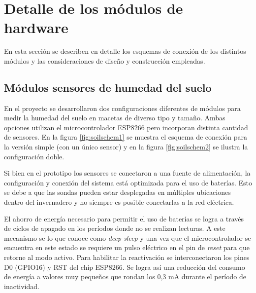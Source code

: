 \section{Detalle de los módulos de hardware}
\label{sec:Módulos de hardware}
En esta sección se describen en detalle los esquemas de conexión de los distintos módulos y las consideraciones de diseño y construcción empleadas. 

\subsection{Módulos sensores de humedad del suelo}
\label{Módulos sensores de humedad del suelo}


En el proyecto se desarrollaron dos configuraciones diferentes de módulos para medir la humedad del suelo en macetas de diverso tipo y tamaño. Ambas opciones utilizan el microcontrolador ESP8266 pero incorporan distinta cantidad de sensores. En la figura \ref{fig:soilschem1} se muestra el esquema de conexión para la versión simple (con un único sensor) y en la figura \ref{fig:soilschem2} se ilustra la configuración doble.

Si bien en el prototipo los sensores se conectaron a una fuente de alimentación, la configuración y conexión del sistema está optimizada para el uso de baterías. Esto se debe a que las sondas pueden estar desplegadas en múltiples ubicaciones dentro del invernadero y no siempre es posible conectarlas a la red eléctrica. 

El ahorro de energía necesario para permitir el uso de  baterías se logra a través de ciclos de apagado en los períodos donde no se realizan lecturas. A este mecanismo se lo que conoce como \textit{deep sleep} y una vez que el microcontrolador se encuentra en este estado se requiere un pulso eléctrico en el pin de \textit{reset} para que retorne al modo activo. 
Para habilitar la reactivación se interconectaron los pines D0 (GPIO16) y RST del chip ESP8266. Se logra así una reducción del consumo de energía a valores muy pequeños que rondan los 0,3 mA durante el período de inactividad.




